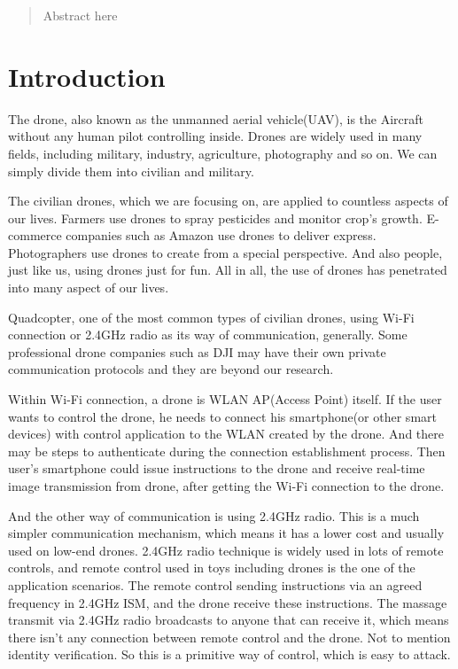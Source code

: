 \documentclass{acm_proc_article-sp}
\begin{document}
\maketitle
\begin{abstract}
Abstract here
\end{abstract}





\section{Introduction}

 The drone, also known as the unmanned aerial vehicle(UAV), is the Aircraft without  any human pilot controlling inside. Drones are widely used in many fields, including military, industry, agriculture, photography and so on. We can simply divide them into civilian and military. 
 
 The civilian drones, which we are focusing on, are applied to countless aspects of our lives.  Farmers use drones to spray pesticides and monitor crop's growth. E-commerce companies such as Amazon use drones to deliver express. Photographers use drones to create from a special perspective. And also people, just like us, using drones just for fun. All in all, the use of drones has penetrated into many aspect of our lives.
 
  Quadcopter, one of the most common types of civilian drones, using Wi-Fi connection or 2.4GHz radio as its way of communication, generally. Some professional drone companies such as DJI may have their own private communication protocols and they are beyond our research.
  
 Within Wi-Fi connection, a drone is WLAN AP(Access Point) itself. If the user wants to control the drone, he needs to connect his smartphone(or other smart devices) with control application to the WLAN created by the drone. And there may be steps to authenticate during the connection establishment process. Then user’s smartphone could issue instructions to the drone and receive real-time image transmission from drone, after getting the Wi-Fi connection to the drone.
 
 And the other way of communication is using 2.4GHz radio. This is a much simpler communication mechanism, which means it has a lower cost and usually used on low-end drones. 2.4GHz radio technique is widely used in lots of remote controls, and remote control used in toys including drones is the one of the application scenarios. The remote control sending instructions via an agreed frequency in 2.4GHz ISM, and the drone receive these instructions. The massage transmit via 2.4GHz radio broadcasts to anyone that can receive it, which means there isn’t any connection between remote control and the drone. Not to mention identity verification. So this is a primitive way of control, which is easy to attack.
\end{document}
